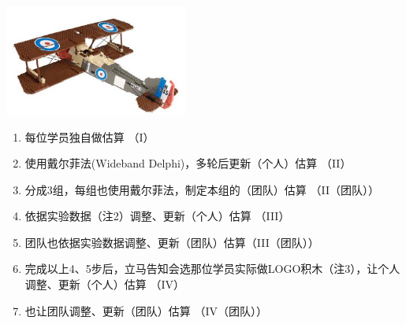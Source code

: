 
\includegraphics[width=6cm]{Lego1.jpg}\\

\begin{enumerate}
\tightlist
\item
  每位学员独自做估算 （I）
\item
  使用戴尔菲法(Wideband Delphi)，多轮后更新（个人）估算 （II）
\item
  分成3组，每组也使用戴尔菲法，制定本组的（团队）估算 （II（团队））
\item
  依据实验数据（注2）调整、更新（个人）估算 （III）
\item
  团队也依据实验数据调整、更新（团队）估算（III（团队））
\item
  完成以上4、5步后，立马告知会选那位学员实际做LOGO积木（注3），让个人调整、更新（个人）估算
  （IV）
\item
  也让团队调整、更新（团队）估算 （IV（团队））
\end{enumerate}

